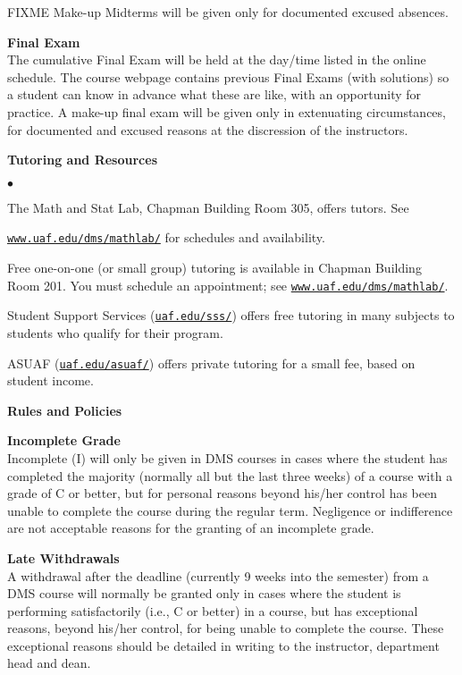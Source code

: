 \documentclass[12pt]{article}
\renewcommand{\emph}[1]{\textsf{\textbf{#1}}}
\newcommand{\localhead}[1]{\par\smallskip\textbf{#1} \smallskip\nobreak\\}%
\def\heading#1{\localhead{\large\emph{#1}}}
\def\subheading#1{\localhead{\emph{#1}}}
\newenvironment{clist}%
{\bgroup\parskip 0pt\begin{list}{$\bullet$}{\partopsep 4pt\topsep 0pt\itemsep -2pt}}%
{\end{list}\egroup}%
\begin{document}
FIXME Make-up Midterms will be given only for documented excused absences.

\heading{Final Exam} 
The cumulative Final Exam will be held at the day/time listed in the online schedule.  The course webpage contains previous Final Exams (with solutions) so a student can know in advance what these are like, with an opportunity for practice.  A make-up final exam will be given only in extenuating circumstances, for documented and excused reasons at the discression of the instructors.

\heading{Tutoring and Resources}
\vskip -30pt\strut
\begin{clist}
	\item The Math and Stat Lab, Chapman Building Room 305, offers tutors. 
	See 

	\href{http://www.uaf.edu/dms/mathlab/}{\texttt{www.uaf.edu/dms/mathlab/}} for schedules and availability.
	\item Free
one-on-one (or small group) tutoring is available in 
Chapman Building Room 201. You must schedule an
appointment; see \href{http://www.uaf.edu/dms/mathlab/}{\texttt{www.uaf.edu/dms/mathlab/}}.
	\item Student Support Services (\href{https://uaf.edu/sss/}{\texttt{uaf.edu/sss/}}) offers free tutoring in many subjects to students who qualify for their program.
	\item ASUAF (\href{https://uaf.edu/asuaf/}{\texttt{uaf.edu/asuaf/}}) offers private tutoring for a small fee, based on student income.
\end{clist}

\heading{Rules and Policies}
\vskip -20pt

\subheading{Incomplete Grade} 
Incomplete (I) will only be given in
  DMS courses in cases where
  the student has completed the majority (normally all but the last
  three weeks) of a course with a grade of C or better, but for
  personal reasons beyond his/her control has been unable to complete
  the course during the regular term. Negligence or indifference are
  not acceptable reasons for the granting of an incomplete
  grade. 

\subheading{Late Withdrawals} 
A withdrawal after the deadline
  (currently 9 weeks into the semester) from a DMS course will
  normally be granted only in cases where the student is performing
  satisfactorily (i.e., C or better) in a course, but has exceptional
  reasons, beyond his/her control, for being unable to complete the
  course. These exceptional reasons should be detailed in writing to
  the instructor, department head and dean.
\end{document}
